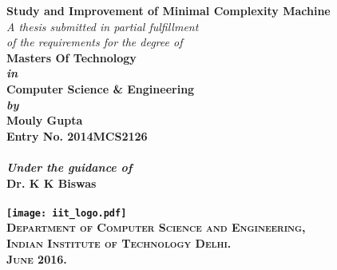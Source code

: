 \begin{titlepage}
\begin{center}

\LARGE{\textsf{\bfseries Study and Improvement of Minimal Complexity Machine}}\\
\vspace{20pt}
\normalsize
\emph{A thesis submitted in partial fulfillment} \\
\emph{of the requirements for the degree of} \\
\vspace{20pt}
\bfseries Masters Of Technology \\
\vspace{20pt}
\emph {in}\\
\vspace{20pt}
\bfseries Computer Science \& Engineering \\
\vspace{20pt}
\emph {by}\\
\vspace{20pt}
\Large{\textsf{\bfseries Mouly Gupta}} \\
{\normalsize \textsf{\bfseries Entry No. 2014MCS2126}}\\
\ \\
{\normalsize \emph {Under the guidance of}}
\ \\
\Large{\textsf{\bfseries Dr. K K Biswas}} \\
\ \\
\vspace{30pt}
\texttt{[image: iit\_logo.pdf]} \\
\vspace{10pt}
\large{\textsc{Department of Computer Science and Engineering,\\
Indian Institute of Technology Delhi.\\ June 2016.}}
\end{center}
\end{titlepage}
